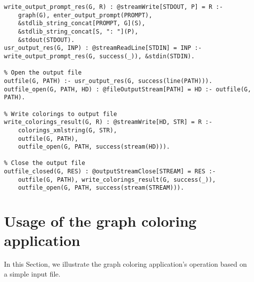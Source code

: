 \begin{lstlisting}[style=asp-code, label={lst:results-xml-graphcol-write-output}, caption={Writing Graph colorings to XML files.}]
% Prompt user for a path to which to write the calculated colorings for each graph
write_output_prompt_res(G, R) : @streamWrite[STDOUT, P] = R :- 
	graph(G), enter_output_prompt(PROMPT), 
	&stdlib_string_concat[PROMPT, G](S),
	&stdlib_string_concat[S, ": "](P),
	&stdout(STDOUT).
usr_output_res(G, INP) : @streamReadLine[STDIN] = INP :- write_output_prompt_res(G, success(_)), &stdin(STDIN).

% Open the output file
outfile(G, PATH) :- usr_output_res(G, success(line(PATH))).
outfile_open(G, PATH, HD) : @fileOutputStream[PATH] = HD :- outfile(G, PATH).

% Write colorings to output file
write_colorings_result(G, R) : @streamWrite[HD, STR] = R :- 
	colorings_xmlstring(G, STR), 
	outfile(G, PATH), 
	outfile_open(G, PATH, success(stream(HD))).

% Close the output file
outfile_closed(G, RES) : @outputStreamClose[STREAM] = RES :- 
	outfile(G, PATH), write_colorings_result(G, success(_)), 
	outfile_open(G, PATH, success(stream(STREAM))).
\end{lstlisting}

\section{Usage of the graph coloring application}

In this Section, we illustrate the graph coloring application's operation based on a simple input file.

